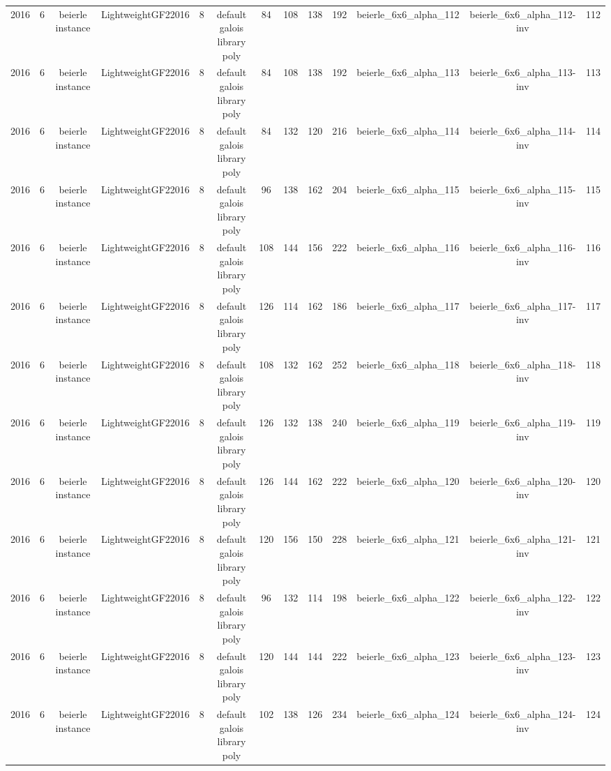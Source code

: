 \begin{tabular}{c c c c c c c c c c c c c}
2016 & 6 & beierle instance & LightweightGF22016 & 8 & default galois library poly & 84 & 108 & 138 & 192 & beierle_6x6_alpha_112 & beierle_6x6_alpha_112-inv & 112 \\
2016 & 6 & beierle instance & LightweightGF22016 & 8 & default galois library poly & 84 & 108 & 138 & 192 & beierle_6x6_alpha_113 & beierle_6x6_alpha_113-inv & 113 \\
2016 & 6 & beierle instance & LightweightGF22016 & 8 & default galois library poly & 84 & 132 & 120 & 216 & beierle_6x6_alpha_114 & beierle_6x6_alpha_114-inv & 114 \\
2016 & 6 & beierle instance & LightweightGF22016 & 8 & default galois library poly & 96 & 138 & 162 & 204 & beierle_6x6_alpha_115 & beierle_6x6_alpha_115-inv & 115 \\
2016 & 6 & beierle instance & LightweightGF22016 & 8 & default galois library poly & 108 & 144 & 156 & 222 & beierle_6x6_alpha_116 & beierle_6x6_alpha_116-inv & 116 \\
2016 & 6 & beierle instance & LightweightGF22016 & 8 & default galois library poly & 126 & 114 & 162 & 186 & beierle_6x6_alpha_117 & beierle_6x6_alpha_117-inv & 117 \\
2016 & 6 & beierle instance & LightweightGF22016 & 8 & default galois library poly & 108 & 132 & 162 & 252 & beierle_6x6_alpha_118 & beierle_6x6_alpha_118-inv & 118 \\
2016 & 6 & beierle instance & LightweightGF22016 & 8 & default galois library poly & 126 & 132 & 138 & 240 & beierle_6x6_alpha_119 & beierle_6x6_alpha_119-inv & 119 \\
2016 & 6 & beierle instance & LightweightGF22016 & 8 & default galois library poly & 126 & 144 & 162 & 222 & beierle_6x6_alpha_120 & beierle_6x6_alpha_120-inv & 120 \\
2016 & 6 & beierle instance & LightweightGF22016 & 8 & default galois library poly & 120 & 156 & 150 & 228 & beierle_6x6_alpha_121 & beierle_6x6_alpha_121-inv & 121 \\
2016 & 6 & beierle instance & LightweightGF22016 & 8 & default galois library poly & 96 & 132 & 114 & 198 & beierle_6x6_alpha_122 & beierle_6x6_alpha_122-inv & 122 \\
2016 & 6 & beierle instance & LightweightGF22016 & 8 & default galois library poly & 120 & 144 & 144 & 222 & beierle_6x6_alpha_123 & beierle_6x6_alpha_123-inv & 123 \\
2016 & 6 & beierle instance & LightweightGF22016 & 8 & default galois library poly & 102 & 138 & 126 & 234 & beierle_6x6_alpha_124 & beierle_6x6_alpha_124-inv & 124 \\

\end{tabular}
